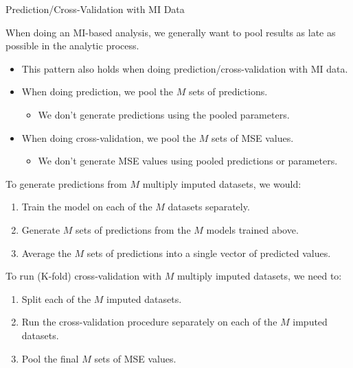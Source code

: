 \documentclass{beamer}\usepackage[]{graphicx}\usepackage[]{color}
\begin{document}
\begin{frame}[allowframebreaks]{Prediction/Cross-Validation with MI Data}

  When doing an MI-based analysis, we generally want to pool results as late as 
  possible in the analytic process.
  \vc
  \begin{itemize}
  \item This pattern also holds when doing prediction/cross-validation with MI 
    data.
    \vc
  \item When doing prediction, we pool the $M$ sets of predictions.
    \begin{itemize}
    \item We don't generate predictions using the pooled parameters.
    \end{itemize}
    \vc
  \item When doing cross-validation, we pool the $M$ sets of MSE values.
    \begin{itemize}
    \item We don't generate MSE values using pooled predictions or parameters.
    \end{itemize}
  \end{itemize}
  
  \pagebreak
  
  To generate predictions from $M$ multiply imputed datasets, we would:
  \begin{enumerate}
  \item Train the model on each of the $M$ datasets separately.
  \item Generate $M$ sets of predictions from the $M$ models trained above.
  \item Average the $M$ sets of predictions into a single vector of predicted 
    values.
  \end{enumerate}
  \vb
  To run (K-fold) cross-validation with $M$ multiply imputed datasets, we need 
  to:
  \begin{enumerate}
  \item Split each of the $M$ imputed datasets.
  \item Run the cross-validation procedure separately on each of the $M$ imputed 
    datasets.
  \item Pool the final $M$ sets of MSE values.
  \end{enumerate}
  
\end{frame}

\end{document}
